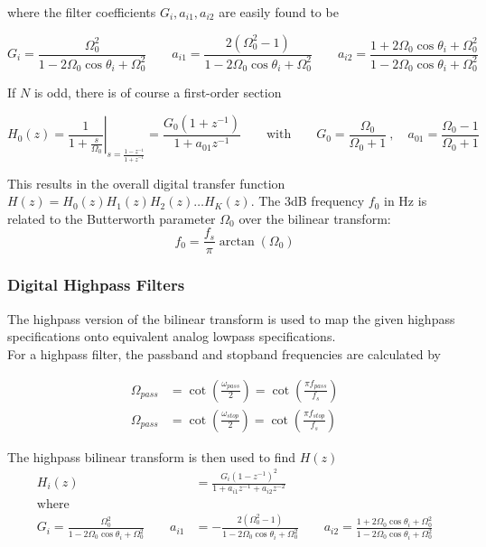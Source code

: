 where the filter coefficients $G_i, a_{i1}, a_{i2}$ are easily found to be

\begin{equation*}
	G_i = \frac{\Omega_0^2}{1 - 2 \Omega_0 \cos\theta_i + \Omega_0^2} \qquad
	a_{i1} = \frac{2(\Omega_0^2 - 1)}{1 - 2 \Omega_0 \cos\theta_i + \Omega_0^2} \qquad
	a_{i2} = \frac{1 + 2 \Omega_0 \cos\theta_i + \Omega_0^2}{1 - 2 \Omega_0 \cos\theta_i + \Omega_0^2}
\end{equation*}

If $N$ is odd, there is of course a first-order section

\begin{equation*}
	H_0(z) = \left.\frac{1}{1+\frac{s}{\Omega_0}}\right|_{s = \frac{1-z^{-1}}{1+z^{-1}}}
	= \frac{G_0 (1+z^{-1})}{1 + a_{01} z^{-1}}
	\qquad \text{with} \qquad
	G_0 = \frac{\Omega_0}{\Omega_0 + 1} \:,\quad
	a_{01}=\frac{\Omega_0 - 1}{\Omega_0 + 1}
\end{equation*}

This results in the overall digital transfer function
$H(z) = H_0(z) H_1(z) H_2(z) \ldots H_K(z)$. The 3dB frequency
$f_0$ in Hz is related to the Butterworth parameter $\Omega_0$ over the
bilinear transform:
\begin{equation*}
	f_0 = \frac{f_s}{\pi} \arctan(\Omega_0)
\end{equation*}

\subsubsection{Digital Highpass Filters}
The highpass version of the bilinear transform is used to map the given
highpass specifications onto equivalent analog lowpass specifications. \\

For a highpass filter, the passband and stopband frequencies are calculated
by

\begin{align*}
	\Omega_{pass} &= \cot \left( \frac{\omega_{pass}}{2} \right)
	= \cot\left( \frac{\pi f_{pass}}{f_s} \right) \\
	\Omega_{pass} &= \cot\left(\frac{\omega_{stop}}{2}\right)
	= \cot\left(\frac{\pi f_{stop}}{f_s}\right)
\end{align*}

The highpass bilinear transform is then used to find $H(z)$
\begin{align*}
	H_i(z) &= \frac{G_i (1-z^{-1})^2}{1 + a_{i1} z^{-1}+a_{i2}z^{-2}} \\
	\text{where} \\
	G_i = \frac{\Omega_0^2}{1-2\Omega_0\cos\theta_i + \Omega_0^2} \qquad
	a_{i1} &= -\frac{2(\Omega_0^2-1)}{1-2\Omega_0\cos\theta_i + \Omega_0^2} \qquad
	a_{i2} = \frac{1 + 2\Omega_0\cos\theta_i + \Omega_0^2}{1-2\Omega_0\cos\theta_i + \Omega_0^2}
\end{align*}

